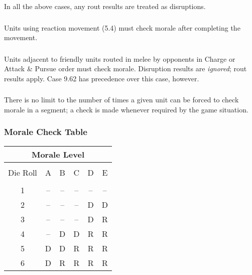 In all the above cases, any rout results are treated as disruptions.

\subsubsection[Reaction Movement]{} Units using reaction movement (5.4) must check morale after completing the movement.

\subsubsection[Adjacent Units]{} Units adjacent to friendly units routed in melee by opponents in Charge or Attack \& Pursue order must check morale. Disruption results are \textit{ignored}; rout results apply. Case 9.62 has precedence over this case, however.

\subsubsection[No Limits]{} There is no limit to the number of times a given unit can be forced to check morale in a segment; a check is made whenever required by the game situation.

\begin{hangsubsubsection}
  \subsubsection{Morale Check Table}
\end{hangsubsubsection}

\begin{tabular}{ |cccccc| }
    \multicolumn{6}{c}{ \textbf{Morale Level}} \\
    \hline & & & & & \\[-2.0ex]
    Die Roll & A & B & C & D & E \\
    \hline \\ [-2.0ex]
    1 & -- & -- & -- & -- & -- \\
    2 & -- & -- & -- & D & D \\
    3 & -- & -- & -- & D & R \\
    4 & -- & D & D & R & R \\
    5 & D & D & R & R & R \\
    6 & D & R & R & R & R \\
    \hline
\end{tabular}
